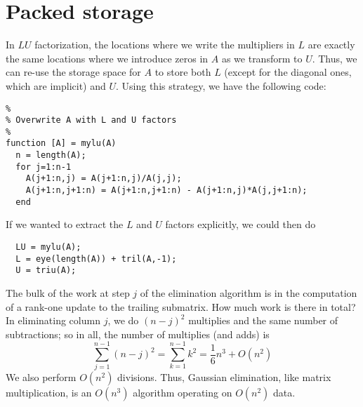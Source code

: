 \section{Packed storage}

In $LU$ factorization, the locations where we write the multipliers in
$L$ are exactly the same locations where we introduce zeros in $A$ as we
transform to $U$.  Thus, we can re-use the storage space for $A$ to
store both $L$ (except for the diagonal ones, which are implicit) and
$U$.  Using this strategy, we have the following code:
\begin{lstlisting}
%
% Overwrite A with L and U factors
%
function [A] = mylu(A)
  n = length(A);
  for j=1:n-1
    A(j+1:n,j) = A(j+1:n,j)/A(j,j);
    A(j+1:n,j+1:n) = A(j+1:n,j+1:n) - A(j+1:n,j)*A(j,j+1:n);
  end
\end{lstlisting}
If we wanted to extract the $L$ and $U$ factors explicitly, we could
then do
\begin{lstlisting}
  LU = mylu(A);
  L = eye(length(A)) + tril(A,-1);
  U = triu(A);
\end{lstlisting}

The bulk of the work at step $j$ of the elimination algorithm is in
the computation of a rank-one update to the trailing submatrix.
How much work is there in total?  In eliminating column $j$, we do
$(n-j)^2$ multiplies and the same number of subtractions; so in all,
the number of multiplies (and adds) is
\[
  \sum_{j=1}^{n-1} (n-j)^2 = \sum_{k=1}^{n-1} k^2 = \frac{1}{6} n^3 + O(n^2)
\]
We also perform $O(n^2)$ divisions.  Thus, Gaussian elimination, like
matrix multiplication, is an $O(n^3)$ algorithm operating on $O(n^2)$ data.
